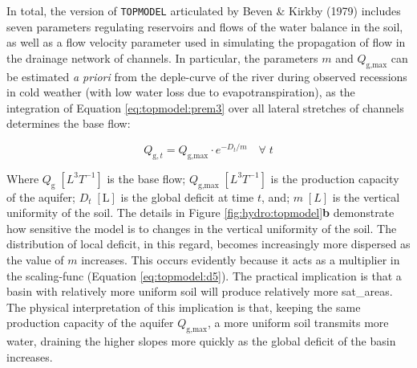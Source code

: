 \documentclass[./main_en.tex]{subfiles}
\begin{document}
\par In total, the version of \texttt{TOPMODEL} articulated by Beven \& Kirkby (1979) includes seven \gls{parameters} regulating reservoirs and flows of the water balance in the soil, as well as a flow velocity parameter used in simulating the propagation of flow in the drainage network of channels. In particular, the \gls{parameters} $m$ and $Q_{\text{g},\text{max}}$ can be estimated \textit{a priori} from the \gls{deple-curve} of the river during observed recessions in cold weather (with low water loss due to evapotranspiration), as the integration of Equation \eqref{eq:topmodel:prem3} over all lateral stretches of channels determines the base flow:
\begin{linenomath*}
\begin{equation}
\label{eq:topmodel:prem3a}
Q_{\text{g}, t} = Q_{\text{g},\text{max}} \cdot e^{-D_{t}/m}  \quad \forall \; t
\end{equation}
\end{linenomath*}
Where $Q_{\text{g}}\;[L^{3}T^{-1}]$ is the base flow; $Q_{\text{g},\text{max}}\;[L^{3}T^{-1}]$ is the production capacity of the aquifer; $D_t\;[\text{L}]$ is the global deficit at time $t$, and; $m\; [L]$ is the vertical uniformity of the soil. The details in Figure \ref{fig:hydro:topmodel}\textbf{b} demonstrate how sensitive the \gls{model} is to changes in the vertical uniformity of the soil. The distribution of local deficit, in this regard, becomes increasingly more dispersed as the value of $m$ increases. This occurs evidently because it acts as a multiplier in the \gls{scaling-func} (Equation \eqref{eq:topmodel:d5}). The practical implication is that a basin with relatively more uniform soil will produce relatively more \gls{sat_areas}. The physical interpretation of this implication is that, keeping the same production capacity of the aquifer $Q_{\text{g},\text{max}}$, a more uniform soil transmits more water, draining the higher slopes more quickly as the global deficit of the basin increases.
\end{document}
